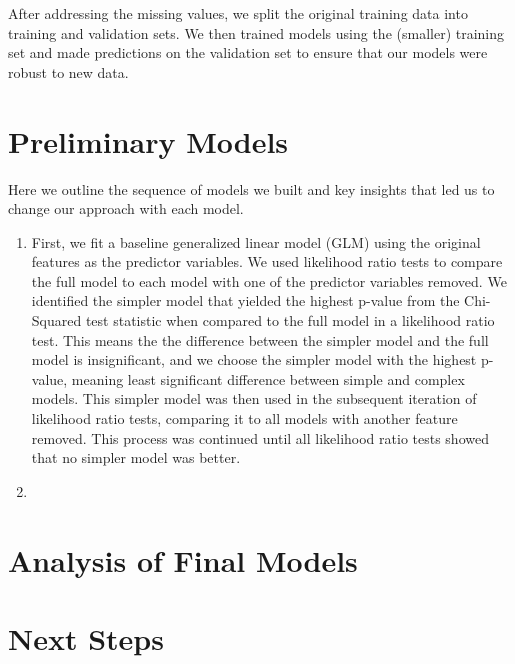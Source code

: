 \documentclass[12pt]{article}
\begin{document}
After addressing the missing values, we split the original training data into training and validation sets.  We then trained models using the (smaller) training set and made predictions on the validation set to ensure that our models were robust to new data.
\section*{Preliminary Models}
Here we outline the sequence of models we built and key insights that led us to change our approach with each model.
\begin{enumerate}
  \item 
  First, we fit a baseline generalized linear model (GLM) using the original features as the predictor variables.  We used likelihood ratio tests to compare the full model to each model with one of the predictor variables removed.  We identified the simpler model that yielded the highest p-value from the Chi-Squared test statistic when compared to the full model in a likelihood ratio test.  This means the the difference between the simpler model and the full model is insignificant, and we choose the simpler model with the highest p-value, meaning least significant difference between simple and complex models.  This simpler model was then used in the subsequent iteration of likelihood ratio tests, comparing it to all models with another feature removed.  This process was continued until all likelihood ratio tests showed that no simpler model was better.
  \item
\end{enumerate}
\section*{Analysis of Final Models}
\section*{Next Steps}
\end{document}
